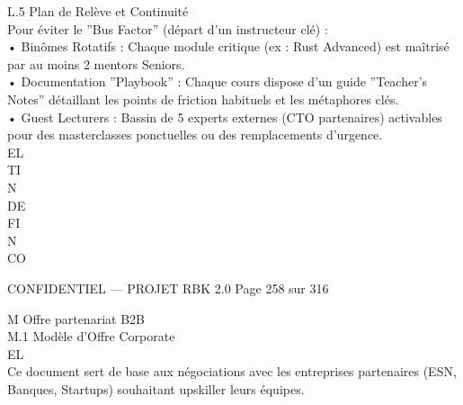 \vspace{0.5em}
L.5 Plan de Relève et Continuité\\
Pour éviter le ”Bus Factor” (départ d’un instructeur clé) :\\
\vspace{0.5em}
• Binômes Rotatifs : Chaque module critique (ex : Rust Advanced) est maîtrisé par au moins 2 mentors Seniors.\\
\vspace{0.5em}
• Documentation ”Playbook” : Chaque cours dispose d’un guide ”Teacher’s Notes” détaillant les points de friction habituels et les métaphores clés.\\
\vspace{0.5em}
• Guest Lecturers : Bassin de 5 experts externes (CTO partenaires) activables pour des masterclasses ponctuelles ou des remplacements d’urgence.\\
\vspace{0.5em}
\vspace{0.5em}
\vspace{0.5em}
\vspace{0.5em}
EL\\
TI\\
N\\
DE\\
FI\\
N\\
CO\\
\vspace{0.5em}
\vspace{0.5em}
\vspace{0.5em}
\vspace{0.5em}
\begin{confidential}CONFIDENTIEL — PROJET RBK 2.0                                          Page 258 sur 316\end{confidential}
M \textbar{} Offre partenariat B2B\\
\vspace{0.5em}
\vspace{0.5em}
M.1 Modèle d’Offre Corporate\\
\vspace{0.5em}
\vspace{0.5em}
\vspace{0.5em}
\vspace{0.5em}
EL\\
Ce document sert de base aux négociations avec les entreprises partenaires (ESN, Banques, Startups) souhaitant upskiller leurs équipes.\\
\vspace{0.5em}
